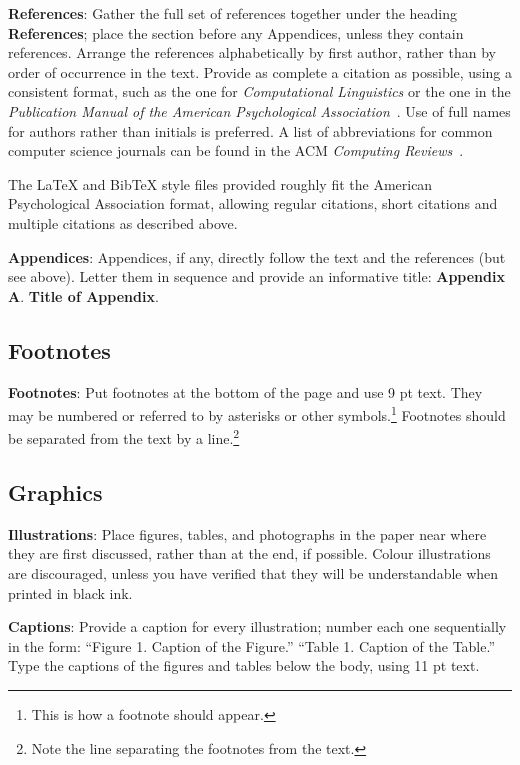 \documentclass[11pt]{article}
\begin{document}
\textbf{References}: Gather the full set of references together under the heading \textbf{References}; place the section before any Appendices, unless they contain references. Arrange the references alphabetically by first author, rather than by order of occurrence in the text. Provide as complete a citation as possible, using a consistent format, such as the one for {\em Computational Linguistics\/} or the one in the {\em Publication Manual of the American Psychological Association\/}~\cite{APA:83}. Use of full names for authors rather than initials is preferred. A list of abbreviations for common computer science journals can be found in the ACM {\em Computing Reviews\/}~\cite{ACM:83}.

The LaTeX and BibTeX style files provided roughly fit the
American Psychological Association format, allowing regular citations, short citations and multiple citations as described above.

\textbf{Appendices}: Appendices, if any, directly follow the text and the references (but see above).  Letter them in sequence and provide an informative title: \textbf{Appendix A}. \textbf{Title of Appendix}.


\subsection{Footnotes}

\textbf{Footnotes}: Put footnotes at the bottom of the page and use 9 pt text. They may be numbered or referred to by asterisks or other symbols.\footnote{This is how a footnote should appear.} Footnotes should be separated from the text by a line.\footnote{Note the line separating the footnotes from the text.}


\subsection{Graphics}

\textbf{Illustrations}: Place figures, tables, and photographs in the paper near where they are first discussed, rather than at the end, if possible. Colour illustrations are discouraged, unless you have verified that they will be understandable when printed in black ink.

\textbf{Captions}: Provide a caption for every illustration; number each one sequentially in the form: ``Figure 1. Caption of the Figure.'' ``Table 1. Caption of the Table.'' Type the captions of the figures and tables below the body, using 11 pt text.
\end{document}
